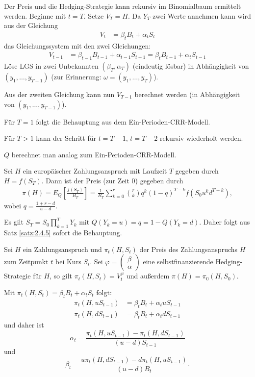 \documentclass[a4paper,twoside,DIV15,BCOR12mm]{scrbook}
\begin{document}
 \begin{beweis}
 Der Preis und die Hedging-Strategie kann rekursiv im Binomialbaum ermittelt werden. Beginne mit $t=T$. Setze $V_T=H$. Da $Y_T$ zwei Werte annehmen kann wird aus der Gleichung 
 \begin{align*}
 V_t&= \beta_t B_t+ \alpha_t S_t
 \end{align*}
das Gleichungssystem mit den zwei Gleichungen:
 \begin{align*}
 V_{t-1}&= \beta_{t-1}B_{t-1}+\alpha_{t-1}S_{t-1}=\beta_tB_{t-1}+\alpha_tS_{t-1}
 \end{align*}
 Löse LGS in zwei Unbekannten $(\beta_T, \alpha_T)$ (eindeutig lösbar) in Abhängigkeit von $(y_1,\ldots,y_{T-1})$ (zur Erinnerung: $\omega=(y_1,\ldots,y_T)$).

 Aus der zweiten Gleichung kann nun $V_{T-1}$ berechnet werden (in Abhängigkeit von $(y_1,\ldots, y_{T-1})$).

 Für $T=1$ folgt die Behauptung aus dem Ein-Perioden-CRR-Modell.

 Für $T>1$ kann der Schritt für $t=T-1$, $t=T-2$ rekursiv wiederholt werden. 

 $Q$ berechnet man analog zum Ein-Perioden-CRR-Modell.
 \end{beweis}
 \begin{korollar}
 Sei $H$ ein europäischer Zahlungsanspruch mit Laufzeit $T$ gegeben durch $H=f(S_T)$. Dann ist der Preis (zur Zeit 0) gegeben durch
 \begin{align*}
 \pi(H)=E_Q\left[\frac{f(S_T)}{B_T}\right]=\frac{1}{B_T} \sum\limits_{k=0}^r \binom{r}{k} q^k (1-q)^{T-k} f(S_0u^kd^{T-k}),
 \end{align*}
wobei $q=\frac{1+r-d}{u-d}$.\label{kor:2.4.6}
 \end{korollar}
 \begin{beweis}
 Es gilt $S_T=S_0 \prod\limits_{k=1}^T Y_k$ mit $Q(Y_k=u)=q=1-Q(Y_k=d)$. Daher folgt aus Satz \ref{satz:2.4.5} sofort die Behauptung.
 \end{beweis}
 
\begin{bemerkung}
Sei $H$ ein Zahlungsanspruch und $\pi_t(H,S_t)$ der Preis des Zahlungsanspruchs $H$ zum Zeitpunkt $t$ bei Kurs $S_t$. Sei 
$\varphi=\left(\begin{smallmatrix} \beta \\ \alpha \end{smallmatrix}\right)$ 
eine selbstfinanzierende Hedging-Strategie für $H$, so gilt $\pi_t(H,S_t)=V_t^\varphi$ und außerdem $\pi(H) = \pi_0(H,S_0)$.

Mit $\pi_t(H,S_t) = \beta_t B_t + \alpha_t S_t$ folgt:
\begin{align*}
\pi_t(H,u S_{t-1}) &= \beta_t B_t + \alpha_t u S_{t-1} \\
\pi_t(H,d S_{t-1}) &= \beta_t B_t + \alpha_t d S_{t-1}
\end{align*}
und daher ist
\[
\alpha_t = \frac{\pi_t(H,uS_{t-1}) - \pi_t(H,dS_{t-1})}{(u-d) S_{t-1}}
\]
und
\[
\beta_t = \frac{u\pi_t(H,d S_{t-1}) - d\pi_t(H,uS_{t-1})}{(u-d)B_t}.
\]
\end{bemerkung}
\end{document}
